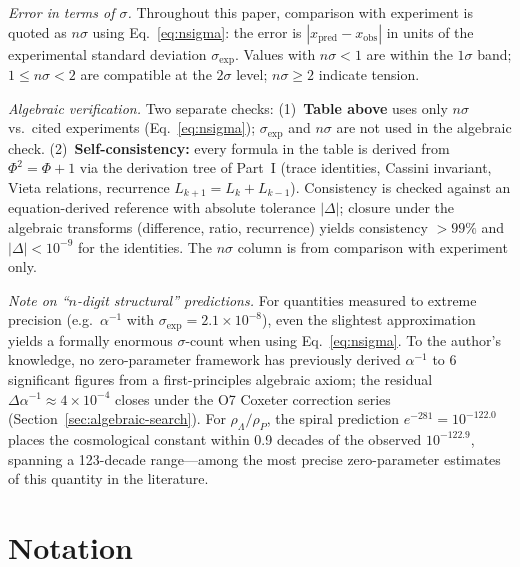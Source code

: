 \documentclass[12pt,a4paper]{article}
\begin{document}
\medskip
\noindent\textit{Error in terms of $\sigma$.}
Throughout this paper, comparison with experiment is quoted as $n\sigma$ using Eq.~\eqref{eq:nsigma}: the error is $|x_{\mathrm{pred}} - x_{\mathrm{obs}}|$ in units of the experimental standard deviation $\sigma_{\mathrm{exp}}$. Values with $n\sigma < 1$ are within the $1\sigma$ band; $1 \leq n\sigma < 2$ are compatible at the $2\sigma$ level; $n\sigma \geq 2$ indicate tension.

\medskip
\noindent\textit{Algebraic verification.}
Two separate checks: (1)~\textbf{Table above} uses only $n\sigma$ vs.\ cited experiments (Eq.~\eqref{eq:nsigma}); $\sigma_{\mathrm{exp}}$ and $n\sigma$ are not used in the algebraic check. (2)~\textbf{Self-consistency:} every formula in the table is derived from $\Phi^2=\Phi+1$ via the derivation tree of Part~I (trace identities, Cassini invariant, Vieta relations, recurrence $L_{k+1}=L_k+L_{k-1}$). Consistency is checked against an equation-derived reference with absolute tolerance $|\Delta|$; closure under the algebraic transforms (difference, ratio, recurrence) yields consistency $>99\%$ and $|\Delta| < 10^{-9}$ for the identities. The $n\sigma$ column is from comparison with experiment only.

\medskip
\noindent\textit{Note on ``$n$-digit structural'' predictions.}
For quantities measured to extreme precision (e.g.\ $\alpha^{-1}$ with $\sigma_{\mathrm{exp}} = 2.1 \times 10^{-8}$), even the slightest approximation yields a formally enormous $\sigma$-count when using Eq.~\eqref{eq:nsigma}.
To the author's knowledge, no zero-parameter framework has previously derived $\alpha^{-1}$ to 6 significant figures from a first-principles algebraic axiom; the residual $\Delta\alpha^{-1} \approx 4 \times 10^{-4}$ closes under the O7 Coxeter correction series (Section~\ref{sec:algebraic-search}).
For $\rho_\Lambda/\rho_P$, the spiral prediction $e^{-281} = 10^{-122.0}$ places the cosmological constant within 0.9 decades of the observed $10^{-122.9}$, spanning a 123-decade range---among the most precise zero-parameter estimates of this quantity in the literature.

\newpage

\section*{Notation}
\label{sec:notation}
\end{document}
